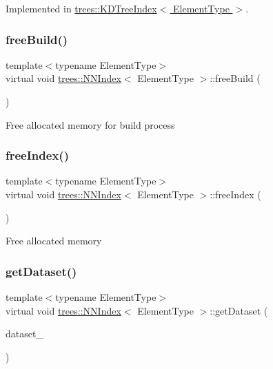 Implemented in \hyperlink{classtrees_1_1_k_d_tree_index_a37e551977e3c3f772846040819a12e8f}{trees\+::\+K\+D\+Tree\+Index$<$ Element\+Type $>$}.

\mbox{\label{classtrees_1_1_n_n_index_a79c8c1c6ffd00422b97e9df49ff39ec6}} 
\subsubsection{\texorpdfstring{free\+Build()}{freeBuild()}}
{\footnotesize\ttfamily template$<$typename Element\+Type$>$ \\
virtual void \hyperlink{classtrees_1_1_n_n_index}{trees\+::\+N\+N\+Index}$<$ Element\+Type $>$\+::free\+Build (\begin{DoxyParamCaption}{ }\end{DoxyParamCaption})\hspace{0.3cm}{\ttfamily [pure virtual]}}

Free allocated memory for build process \mbox{\label{classtrees_1_1_n_n_index_afc6b99a8f2693e8b446fc6697dac9f0d}} 
\subsubsection{\texorpdfstring{free\+Index()}{freeIndex()}}
{\footnotesize\ttfamily template$<$typename Element\+Type$>$ \\
virtual void \hyperlink{classtrees_1_1_n_n_index}{trees\+::\+N\+N\+Index}$<$ Element\+Type $>$\+::free\+Index (\begin{DoxyParamCaption}{ }\end{DoxyParamCaption})\hspace{0.3cm}{\ttfamily [pure virtual]}}

Free allocated memory \mbox{\label{classtrees_1_1_n_n_index_ab209928ad7cf136a482563720d29e2c4}} 
\subsubsection{\texorpdfstring{get\+Dataset()}{getDataset()}}
{\footnotesize\ttfamily template$<$typename Element\+Type$>$ \\
virtual void \hyperlink{classtrees_1_1_n_n_index}{trees\+::\+N\+N\+Index}$<$ Element\+Type $>$\+::get\+Dataset (\begin{DoxyParamCaption}\item[{\hyperlink{classtrees_1_1_matrix}{Matrix}$<$ Element\+Type $>$ \&}]{dataset\+\_\+ }\end{DoxyParamCaption})\hspace{0.3cm}{\ttfamily [pure virtual]}}

